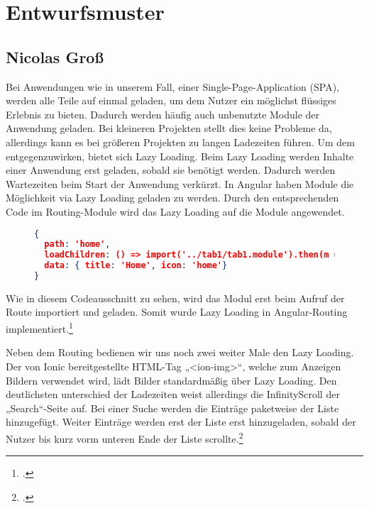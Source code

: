 
\section{Entwurfsmuster}

\subsection*{Nicolas Groß}

Bei Anwendungen wie in unserem Fall, einer Single-Page-Application (SPA), werden alle Teile auf einmal geladen, um dem Nutzer ein möglichst flüssiges Erlebnis zu bieten. Dadurch werden häufig auch unbenutzte Module der Anwendung geladen. Bei kleineren Projekten stellt dies keine Probleme da, allerdings kann es bei größeren Projekten zu langen Ladezeiten führen. Um dem entgegenzuwirken, bietet sich Lazy Loading. Beim Lazy Loading werden Inhalte einer Anwendung erst geladen, sobald sie benötigt werden. Dadurch werden Wartezeiten beim Start der Anwendung verkürzt.
In Angular haben Module die Möglichkeit via Lazy Loading geladen zu werden. Durch den entsprechenden Code im Routing-Module wird das Lazy Loading auf die Module angewendet.

\begin{figure}[bht]
\begin{lstlisting}[caption=Codeausschnitt des Tabs Routingmodule,language=json]
{
  path: 'home',
  loadChildren: () => import('../tab1/tab1.module').then(m => Tab1PageModule),
  data: { title: 'Home', icon: 'home'}
}
\end{lstlisting}
\end{figure}

Wie in diesem Codeausschnitt zu sehen, wird das Modul erst beim Aufruf der Route importiert und geladen. Somit wurde Lazy Loading in Angular-Routing implementiert.\footcites[.vgl]{LazyLoading2021}

Neben dem Routing bedienen wir uns noch zwei weiter Male den Lazy Loading. Der von Ionic bereitgestellte HTML-Tag „<ion-img>“, welche zum Anzeigen Bildern verwendet wird, lädt Bilder standardmäßig über Lazy Loading. Den deutlichsten unterschied der Ladezeiten weist allerdings die InfinityScroll der „Search“-Seite auf. Bei einer Suche werden die Einträge paketweise der Liste hinzugefügt. Weiter Einträge werden erst der Liste erst hinzugeladen, sobald der Nutzer bis kurz vorm unteren Ende der Liste scrollte.\footcites[.vgl]{Ionic2013b}

